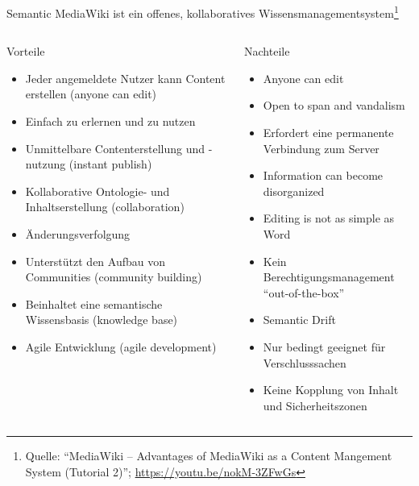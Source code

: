 \documentclass[aspectratio=1610,onlymath]{beamer}
\begin{document}
\begin{frame}{Semantic MediaWiki ist ein offenes, kollaboratives Wissensmanagementsystem\footnote{Quelle: ``MediaWiki – Advantages of MediaWiki as a Content Mangement System (Tutorial 2)'';  \url{https://youtu.be/nokM-3ZFwGs}}}

\begin{footnotesize}
\begin{columns}
\begin{column}{0.5\textwidth}

Vorteile 
\begin{itemize}
	\item Jeder angemeldete Nutzer kann Content erstellen (anyone can edit)
	\item Einfach zu erlernen und zu nutzen
	\item Unmittelbare Contenterstellung und -nutzung (instant publish)
	\item Kollaborative Ontologie- und Inhaltserstellung (collaboration)
	\item Änderungsverfolgung 
	\item Unterstützt den Aufbau von Communities (community building)
	\item Beinhaltet eine semantische Wissensbasis (knowledge base)
	\item Agile Entwicklung (agile development)
\end{itemize}
\end{column}
\begin{column}{0.5\textwidth}
Nachteile
\begin{itemize}
	\item Anyone can edit
	\item Open to span and vandalism
	\item Erfordert eine permanente Verbindung zum Server
	\item Information can become disorganized
	\item Editing is not as simple as Word
	\item Kein Berechtigungsmanagement ``out-of-the-box''
	\item Semantic Drift 
	\item Nur bedingt geeignet für Verschlusssachen
	\item Keine Kopplung von Inhalt und Sicherheitszonen
\end{itemize}
\end{column}
\end{columns}
\end{footnotesize}
\end{frame}
\end{document}
